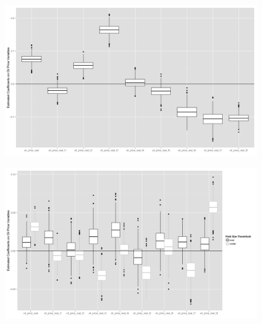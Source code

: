 \documentclass{beamer}
\begin{document}
\begin{frame}[plain]
\begin{figure}
	\includegraphics[width=1\textwidth]{figures/invest_pooled_print.png}
	\label{gam_price_invest_box}
\end{figure}
\end{frame}

\begin{frame}[plain]
	\begin{figure}
	\includegraphics[width=1\textwidth]{figures/gam_postpeak_print.png}
	\label{gam_postpeak_pres}
	\end{figure}
\end{frame}
\end{document}
